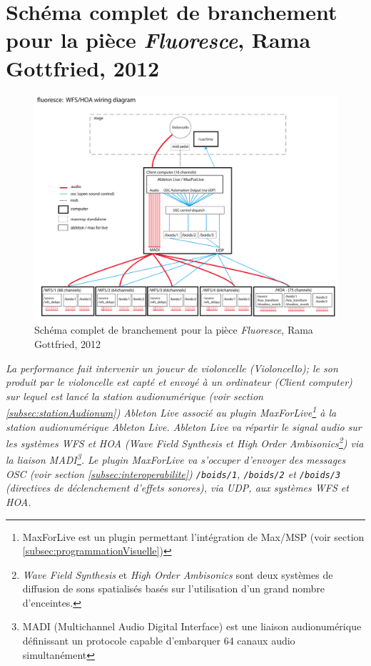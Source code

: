 \section{Schéma complet de branchement pour la pièce \textit{Fluoresce}, Rama Gottfried, 2012}				\label{sec:schemaInstallationFluoresceComplet}
\begin{figure}[H]
	\centering	
	\includegraphics[keepaspectratio=true, width=\textwidth]{Annexes/i/schemaInstallationFluoresceComplet.png}
	\caption{Schéma complet de branchement pour la pièce \textit{Fluoresce}, Rama Gottfried, 2012}
	\label{fig:schemaInstallationFluoresceComplet}
\end{figure}
\begin{center}
\small
\it
La performance fait intervenir un joueur de violoncelle (Violoncello); le son produit par le violoncelle est capté et envoyé à un ordinateur (Client computer) sur lequel est lancé la station audionumérique (voir section \ref{subsec:stationAudionum}) Ableton Live associé au plugin MaxForLive\footnote{MaxForLive est un plugin permettant l'intégration de Max/MSP (voir section \ref{subsec:programmationVisuelle})} à la station audionumérique Ableton Live. Ableton Live va répartir le signal audio sur les systèmes WFS et HOA (Wave Field Synthesis et High Order Ambisonics\footnote{\textit{Wave Field Synthesis} et \textit{High Order Ambisonics} sont deux systèmes de diffusion de sons spatialisés basés sur l'utilisation d'un grand nombre d'enceintes.}) via la liaison MADI\footnote{MADI (Multichannel Audio Digital Interface) est une liaison audionumérique définissant un protocole capable d'embarquer 64 canaux audio simultanément}. Le plugin MaxForLive va s'occuper d'envoyer des messages OSC (voir section \ref{subsec:interoperabilite}) \texttt{/boids/1}, \texttt{/boids/2} et \texttt{/boids/3} (directives de déclenchement d'effets sonores), via UDP, aux systèmes WFS et HOA.
\end{center}

